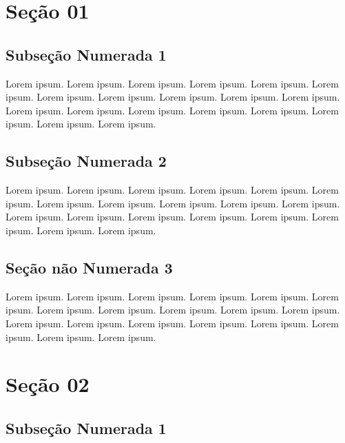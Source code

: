\documentclass[
]{book}
\begin{document}
\hypertarget{seuxe7uxe3o-01}{%
\section{Seção 01}\label{seuxe7uxe3o-01}}

\hypertarget{subseuxe7uxe3o-numerada-1-4}{%
\subsection{Subseção Numerada 1}\label{subseuxe7uxe3o-numerada-1-4}}

Lorem ipsum. Lorem ipsum. Lorem ipsum. Lorem ipsum. Lorem ipsum. Lorem ipsum. Lorem ipsum. Lorem ipsum. Lorem ipsum. Lorem ipsum. Lorem ipsum. Lorem ipsum. Lorem ipsum. Lorem ipsum. Lorem ipsum. Lorem ipsum. Lorem ipsum. Lorem ipsum. Lorem ipsum.

\hypertarget{subseuxe7uxe3o-numerada-2}{%
\subsection{Subseção Numerada 2}\label{subseuxe7uxe3o-numerada-2}}

Lorem ipsum. Lorem ipsum. Lorem ipsum. Lorem ipsum. Lorem ipsum. Lorem ipsum. Lorem ipsum. Lorem ipsum. Lorem ipsum. Lorem ipsum. Lorem ipsum. Lorem ipsum. Lorem ipsum. Lorem ipsum. Lorem ipsum. Lorem ipsum. Lorem ipsum. Lorem ipsum. Lorem ipsum.

\hypertarget{seuxe7uxe3o-nuxe3o-numerada-3-4}{%
\subsection*{Seção não Numerada 3}\label{seuxe7uxe3o-nuxe3o-numerada-3-4}}

Lorem ipsum. Lorem ipsum. Lorem ipsum. Lorem ipsum. Lorem ipsum. Lorem ipsum. Lorem ipsum. Lorem ipsum. Lorem ipsum. Lorem ipsum. Lorem ipsum. Lorem ipsum. Lorem ipsum. Lorem ipsum. Lorem ipsum. Lorem ipsum. Lorem ipsum. Lorem ipsum. Lorem ipsum.

\hypertarget{seuxe7uxe3o-02}{%
\section{Seção 02}\label{seuxe7uxe3o-02}}

\hypertarget{subseuxe7uxe3o-numerada-1-5}{%
\subsection{Subseção Numerada 1}\label{subseuxe7uxe3o-numerada-1-5}}
\end{document}
